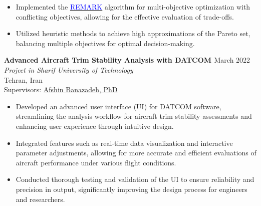 \documentclass[12pt]{article}
\begin{document}
\begin{itemize} \itemsep -1pt %
    \item Implemented the \href{https://link.springer.com/article/10.1007/s12652-022-04332-8}{\textcolor{blue}{REMARK}} algorithm for multi-objective optimization with conflicting objectives, allowing for the effective evaluation of trade-offs.
    \item Utilized heuristic methods to achieve high approximations of the Pareto set, balancing multiple objectives for optimal decision-making.
\end{itemize}
\newpage

\vspace{0.2in}
\noindent
{\bfseries Advanced Aircraft Trim Stability Analysis with DATCOM
\href{https://github.com/alibaniasad1999/DATCOM-Trim-Diagram-GUI}{\faGithub}
}
\hfill March 2022 \\ 
\noindent \textit{Project in Sharif University of Technology} \\ \hfill Tehran, Iran \\ 
\noindent Supervisors: 
\href{http://ae.sharif.edu/~portal/faculty/1014037799}{Afshin Banazadeh, PhD} 
\begin{itemize} \itemsep -1pt %
    \item Developed an advanced user interface (UI) for DATCOM software, streamlining the analysis workflow for aircraft trim stability assessments and enhancing user experience through intuitive design.
    \item Integrated features such as real-time data visualization and interactive parameter adjustments, allowing for more accurate and efficient evaluations of aircraft performance under various flight conditions.
    \item Conducted thorough testing and validation of the UI to ensure reliability and precision in output, significantly improving the design process for engineers and researchers.
\end{itemize}
\end{document}
